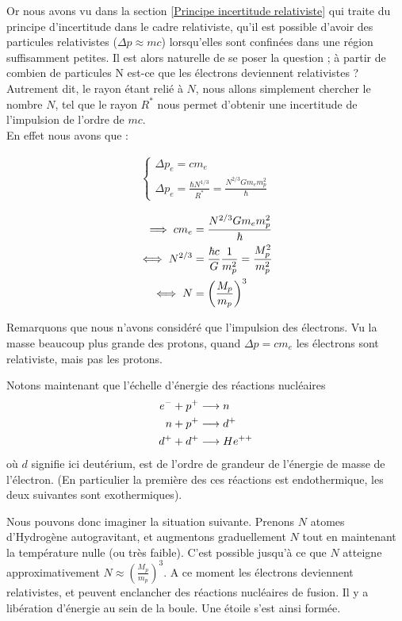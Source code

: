 \documentclass{book}
\begin{document}
Or nous avons vu dans la section \ref{Principe incertitude relativiste} qui traite du principe d'incertitude dans le cadre relativiste, qu'il est possible d'avoir des particules relativistes ($\Delta p \approx mc$) lorsqu'elles sont confinées dans une région suffisamment petites. Il est alors naturelle de se poser la question ; à partir de combien de particules N est-ce que les électrons deviennent relativistes ? Autrement dit, le rayon étant relié à $N$, nous allons simplement chercher le nombre $N$, tel que le rayon $R^*$ nous permet d'obtenir une incertitude de l'impulsion de l'ordre de $mc$.  \\

En effet nous avons que : 

\begin{align*}
    \left\lbrace
\begin{array}{ccc}
    \Delta p_e = cm_e \\
    \Delta p_e = \frac{\hbar N^{1/3}}{R^*} = \frac{N^{2/3} G m_e m^2_p}{\hbar}
\end{array}\right.
\end{align*}

\begin{align}
    \implies cm_e &= \frac{N^{2/3} G m_e m^2_p}{\hbar} \notag \\
    \iff N^{2/3} &= \frac{\hbar c}{G}\frac{1}{m^2_p} = \frac{M^2_p}{m^2_p} \notag \\
    \iff N &= \left( \frac{M_p}{m_p} \right)^3
\end{align}

Remarquons que nous n'avons considéré que l'impulsion des électrons. Vu la masse beaucoup plus grande des protons, quand $\Delta p = cm_e$ les électrons sont relativiste, mais pas les protons.

Notons maintenant que l'échelle d'énergie des réactions nucléaires 
\begin{align}
e^- + p^+ &\longrightarrow n \notag \\
n + p^+ &\longrightarrow d^+ \notag \\
d^+ + d^+ &\longrightarrow He^{++} \notag
\end{align}
où $d$ signifie ici deutérium,
est de l'ordre de grandeur de l'énergie de masse de l'électron. (En particulier la première des ces réactions est endothermique, les deux suivantes sont exothermiques).


Nous pouvons donc imaginer la situation suivante. Prenons $N$ atomes d'Hydrogène autogravitant, et augmentons graduellement $N$ tout en maintenant la température nulle (ou très faible). C'est possible jusqu'à ce que $N$ atteigne approximativement $N\approx  \left( \frac{M_p}{m_p} \right)^3$. A ce moment les électrons deviennent relativistes, et peuvent enclancher des réactions
nucléaires de fusion. Il y a libération d'énergie au sein de la boule. Une étoile s'est ainsi formée. \\ 
\end{document}
